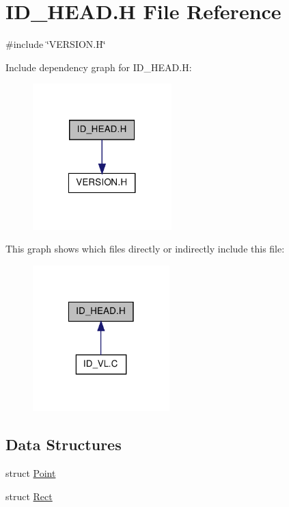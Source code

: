 \hypertarget{ID__HEAD_8H}{
\section{ID\_\-HEAD.H File Reference}
\label{ID__HEAD_8H}
}
{\ttfamily \#include \char`\"{}VERSION.H\char`\"{}}\par
Include dependency graph for ID\_\-HEAD.H:
\nopagebreak
\begin{figure}[H]
\begin{center}
\leavevmode
\includegraphics[width=152pt]{ID__HEAD_8H__incl}
\end{center}
\end{figure}
This graph shows which files directly or indirectly include this file:
\nopagebreak
\begin{figure}[H]
\begin{center}
\leavevmode
\includegraphics[width=150pt]{ID__HEAD_8H__dep__incl}
\end{center}
\end{figure}
\subsection*{Data Structures}
\begin{DoxyCompactItemize}
\item 
struct \hyperlink{structPoint}{Point}
\item 
struct \hyperlink{structRect}{Rect}
\end{DoxyCompactItemize}
